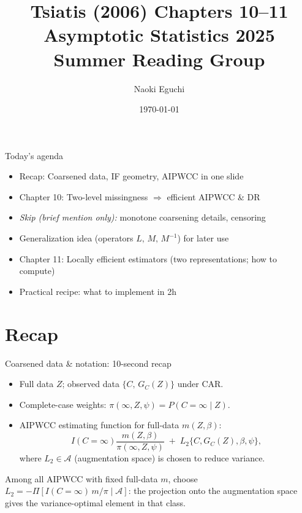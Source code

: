 \documentclass[xcolor=dvipsnames,aspectratio=169]{beamer}
\title{Tsiatis (2006) Chapters 10--11\\ \small{Asymptotic Statistics 2025 Summer Reading Group}}
\author{Naoki Eguchi}
\institute{Faculty of Medicine, Kyoto University}
\date{\today}
\newcommand{\1}{\mathbbm{1}}
\begin{document}
\begin{frame}
  \titlepage
\end{frame}

\begin{frame}{Today's agenda}
  \begin{itemize}
    \item Recap: Coarsened data, IF geometry, AIPWCC in one slide
    \item Chapter 10: Two-level missingness $\Rightarrow$ efficient AIPWCC \& DR
    \item \emph{Skip (brief mention only):} monotone coarsening details, censoring
    \item Generalization idea (operators $L,\,M,\,M^{-1}$) for later use
    \item Chapter 11: Locally efficient estimators (two representations; how to compute)
    \item Practical recipe: what to implement in 2h
  \end{itemize}
\end{frame}

\section{Recap}

\begin{frame}{Coarsened data \& notation: 10-second recap}
  \begin{itemize}
    \item Full data $Z$; observed data $\{C,\,G_C(Z)\}$ under CAR.
    \item Complete-case weights: $\pi(\infty,Z,\psi)=P(C=\infty\mid Z)$.
    \item AIPWCC estimating function for full-data $m(Z,\beta)$:
    \[
      I(C=\infty)\frac{m(Z,\beta)}{\pi(\infty,Z,\psi)}\;+\;L_2\{C,G_C(Z),\beta,\psi\},
    \]
    where $L_2\in\mathcal{A}$ (augmentation space) is chosen to reduce variance.
  \end{itemize}
  \begin{tcolorbox}[title=Key idea, colback=gray!5!white]
  Among all AIPWCC with fixed full-data $m$, choose $L_2=-\Pi\!\left[I(C=\infty)\,m/\pi \mid \mathcal{A}\right]$:
  the projection onto the augmentation space gives the variance-optimal element in that class.
  \end{tcolorbox}
\end{frame}
\end{document}
